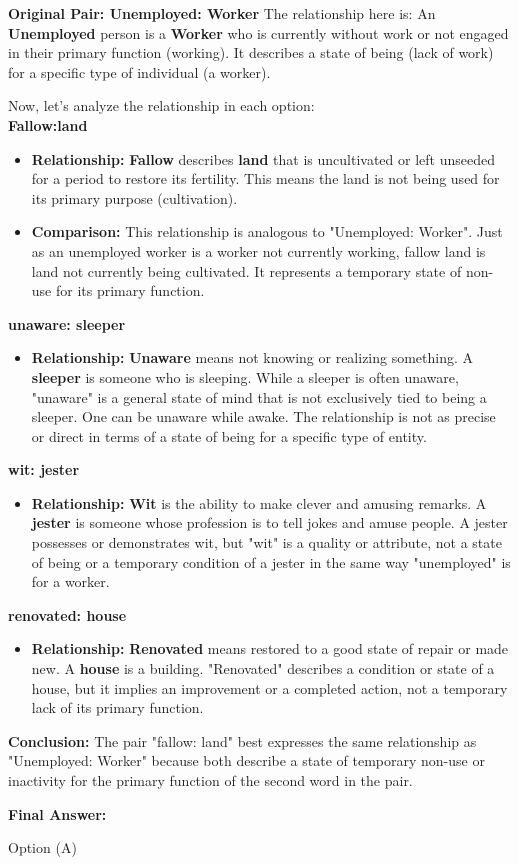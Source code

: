 \documentclass[a4paper,12pt]{article}
\begin{document}
\textbf{Original Pair: Unemployed: Worker}
The relationship here is: An \textbf{Unemployed} person is a \textbf{Worker} who is currently without work or not engaged in their primary function (working). It describes a state of being (lack of work) for a specific type of individual (a worker).
\begin{enumitem}

Now, let's analyze the relationship in each option: \\
  \noindent \textbf{Fallow:land} \\
    \begin{itemize}
       \item \textbf{Relationship:}
 \textbf{Fallow} describes \textbf{land} that is uncultivated or left unseeded for a period to restore its fertility. This means the land is not being used for its primary purpose (cultivation).
        \item \textbf{Comparison:} This relationship is analogous to "Unemployed: Worker". Just as an unemployed worker is a worker not currently working, fallow land is land not currently being cultivated. It represents a temporary state of non-use for its primary function.
    \end{itemize}

    \textbf{unaware: sleeper}
    \begin{itemize}
        \item \textbf{Relationship:} \textbf{Unaware} means not knowing or realizing something. A \textbf{sleeper} is someone who is sleeping. While a sleeper is often unaware, "unaware" is a general state of mind that is not exclusively tied to being a sleeper. One can be unaware while awake. The relationship is not as precise or direct in terms of a state of being for a specific type of entity.
    \end{itemize}

    \textbf{wit: jester}
    \begin{itemize}
        \item \textbf{Relationship:} \textbf{Wit} is the ability to make clever and amusing remarks. A \textbf{jester} is someone whose profession is to tell jokes and amuse people. A jester possesses or demonstrates wit, but "wit" is a quality or attribute, not a state of being or a temporary condition of a jester in the same way "unemployed" is for a worker.
    \end{itemize}

     \textbf{renovated: house}
    \begin{itemize}
        \item \textbf{Relationship:} \textbf{Renovated} means restored to a good state of repair or made new. A \textbf{house} is a building. "Renovated" describes a condition or state of a house, but it implies an improvement or a completed action, not a temporary lack of its primary function.
    \end{itemize}
\end{enumitem}

\textbf{Conclusion:}
The pair "fallow: land" best expresses the same relationship as "Unemployed: Worker" because both describe a state of temporary non-use or inactivity for the primary function of the second word in the pair.

\textbf{Final Answer:}

Option (A)
\end{document}
